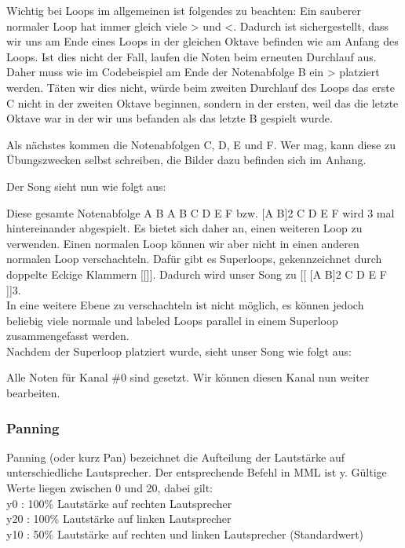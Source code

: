 \medskip

Wichtig bei Loops im allgemeinen ist folgendes zu beachten: Ein sauberer normaler Loop hat immer gleich viele > und <. Dadurch ist sichergestellt, dass wir uns am Ende eines Loops in der gleichen Oktave befinden wie am Anfang des Loops. Ist dies nicht der Fall, laufen die Noten beim erneuten Durchlauf aus. Daher muss wie im Codebeispiel am Ende der Notenabfolge B ein > platziert werden.
Täten wir dies nicht, würde beim zweiten Durchlauf des Loops das erste C nicht in der zweiten Oktave beginnen, sondern in der ersten, weil das die letzte Oktave war in der wir uns befanden als das letzte B gespielt wurde.

\bigskip

Als nächstes kommen die Notenabfolgen C, D, E und F. Wer mag, kann diese zu Übungszwecken selbst schreiben, die Bilder dazu befinden sich im Anhang.

Der Song sieht nun wie folgt aus:

\medskip



\medskip

Diese gesamte Notenabfolge A B A B C D E F bzw. [A B]2 C D E F wird 3 mal hintereinander abgespielt. Es bietet sich daher an, einen weiteren Loop zu verwenden. Einen normalen Loop können wir aber nicht in einen anderen normalen Loop verschachteln. Dafür gibt es Superloops, gekennzeichnet durch doppelte Eckige Klammern [[]].
Dadurch wird unser Song zu [[ [A B]2 C D E F ]]3. \\
In eine weitere Ebene zu verschachteln ist nicht möglich, es können jedoch beliebig viele normale und labeled Loops parallel in einem Superloop zusammengefasst werden. \\
Nachdem der Superloop platziert wurde, sieht unser Song wie folgt aus:

\medskip



\medskip

Alle Noten für Kanal \#0 sind gesetzt. Wir können diesen Kanal nun weiter bearbeiten.

\subsubsection{Panning}
Panning (oder kurz Pan) bezeichnet die Aufteilung der Lautstärke auf unterschiedliche Lautsprecher. Der entsprechende Befehl in MML ist y. Gültige Werte liegen zwischen 0 und 20, dabei gilt: \\
y0 : 100\% Lautstärke auf rechten Lautsprecher \\
y20 : 100\% Lautstärke auf linken Lautsprecher \\
y10 : 50\% Lautstärke auf rechten und linken Lautsprecher (Standardwert) 

